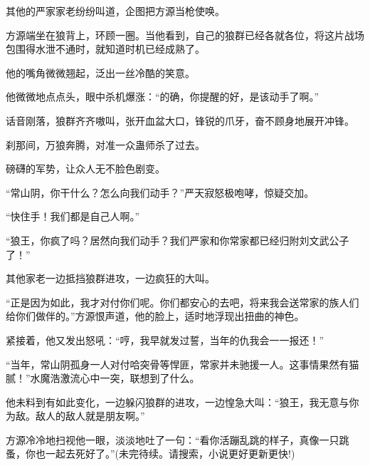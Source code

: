\begin{this_body}
其他的严家家老纷纷叫道，企图把方源当枪使唤。

方源端坐在狼背上，环顾一圈。当他看到，自己的狼群已经各就各位，将这片战场包围得水泄不通时，就知道时机已经成熟了。

他的嘴角微微翘起，泛出一丝冷酷的笑意。

他微微地点点头，眼中杀机爆涨：“的确，你提醒的好，是该动手了啊。”

话音刚落，狼群齐齐嗷叫，张开血盆大口，锋锐的爪牙，奋不顾身地展开冲锋。

刹那间，万狼奔腾，对准一众蛊师杀了过去。

磅礴的军势，让众人无不脸色剧变。

“常山阴，你干什么？怎么向我们动手？”严天寂怒极咆哮，惊疑交加。

“快住手！我们都是自己人啊。”

“狼王，你疯了吗？居然向我们动手？我们严家和你常家都已经归附刘文武公子了！”

其他家老一边抵挡狼群进攻，一边疯狂的大叫。

“正是因为如此，我才对付你们呢。你们都安心的去吧，将来我会送常家的族人们给你们做伴的。”方源恨声道，他的脸上，适时地浮现出扭曲的神色。

紧接着，他又发出怒吼：“哼，我早就发过誓，当年的仇我会一一报还！”

“当年，常山阴孤身一人对付哈突骨等悍匪，常家并未驰援一人。这事情果然有猫腻！”水魔浩激流心中一突，联想到了什么。

他未料到有如此变化，一边躲闪狼群的进攻，一边惶急大叫：“狼王，我无意与你为敌。敌人的敌人就是朋友啊。”

方源冷冷地扫视他一眼，淡淡地吐了一句：“看你活蹦乱跳的样子，真像一只跳蚤，你也一起去死好了。”(未完待续。请搜索，小说更好更新更快!)

\end{this_body}

